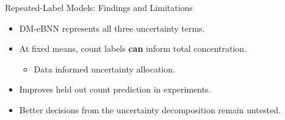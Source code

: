 % 


\begin{frame}{Repeated-Label Models: Findings and Limitations}
\label{frm:count-model-interpretation}
\begin{itemize}
\setlength{\itemsep}{5mm}
\item DM-eBNN represents all three uncertainty terms.
\item At fixed means, count labels \textbf{can} inform total concentration.
\begin{itemize}
\item Data informed uncertainty allocation.
\end{itemize}
\item Improves held out count prediction in experiments.
\item Better decisions from the uncertainty decomposition remain untested.
\end{itemize}
\end{frame}